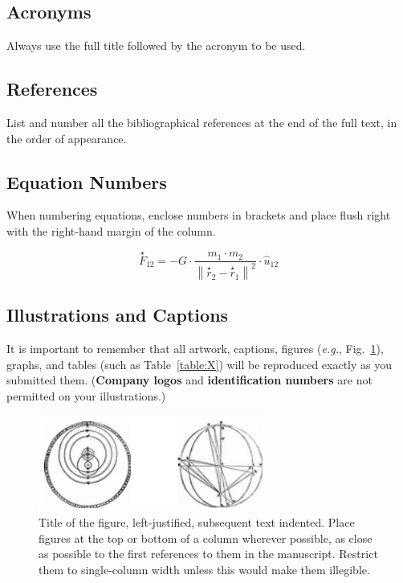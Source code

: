 \documentclass[]{iac}
\begin{document}
\subsection{Acronyms}
Always use the full title followed by the acronym to be used.

\subsection{References}
List and number all the bibliographical references at the end of the full text, in the order of appearance.\cite{IAFSecretariat2014}

\subsection{Equation Numbers}
When numbering equations, enclose numbers in brackets and place flush right with the right-hand margin of the column.

\begin{equation}
\stackrel{\star}{F}_{12} = -G \cdot \frac{ m_1 \cdot m_2 }{ \left\|\stackrel{\star}{r}_2 - \stackrel{\star}{r}_1\right\|^2 } \cdot \hat{u}_{12}
\end{equation}

\subsection{Illustrations and Captions}
It is important to remember that all artwork, captions, figures (\textit{e.g.}, Fig.~\ref{fig:X}), graphs, and tables (such as Table~\ref{table:X}) will be reproduced exactly as you submitted them. (\textbf{Company logos} and \textbf{identification numbers} are not permitted on your illustrations.)

\begin{figure}
\includegraphics[width=\columnwidth]{examplefigure.png}
\caption{\label{fig:X}Title of the figure, left-justified, subsequent text indented. Place figures at the top or bottom of a column wherever possible, as close as possible to the first references to them in the manuscript. Restrict them to single-column width unless this would make them illegible.} 
\end{figure}
\end{document}
